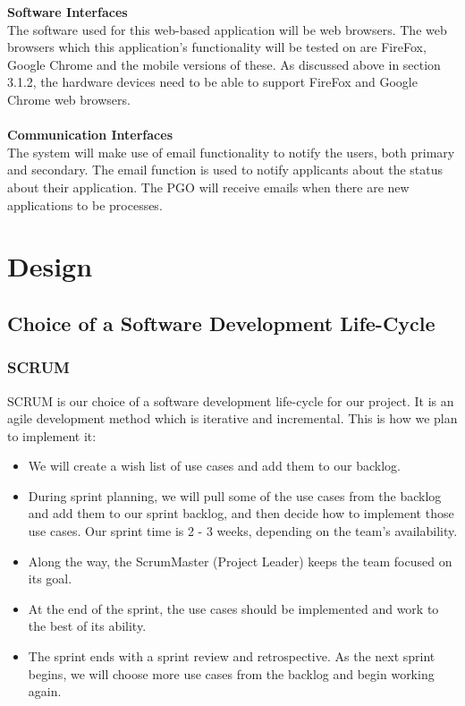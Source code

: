\documentclass{article}
\begin{document}
\textbf{Software Interfaces} \\
The software used for this web-based application will be web browsers. The web browsers which this application’s functionality will be tested on are FireFox, Google Chrome and the mobile versions of these. As discussed above in section 3.1.2, the hardware devices need to be able to support FireFox and Google Chrome web browsers.\\  \\
\textbf{Communication Interfaces} \\
The system will make use of email functionality to notify the users, both primary and secondary. The email function is used to notify applicants about the status about their application. The PGO will receive emails when there are new applications to be processes. 

\section{Design}
\subsection{Choice of a Software Development Life-Cycle}
\subsubsection{SCRUM}
SCRUM is our choice of a software development life-cycle for our project. It is an agile development method which is iterative and incremental.
This is how we plan to implement it:
\begin{itemize}
\item We will create a wish list of use cases and add them to our backlog.
\item During sprint planning, we will pull some of the use cases from the backlog and add them to our sprint backlog, and then decide how to implement those use cases.
Our sprint time is 2 - 3 weeks, depending on the team's availability. 
\item Along the way, the ScrumMaster (Project Leader) keeps the team focused on its goal.
\item At the end of the sprint, the use cases should be implemented and work to the best of its ability. 
\item The sprint ends with a sprint review and retrospective.
As the next sprint begins, we will choose more use cases from the backlog and begin working again. \cite{Scrum}
\end{itemize}
\end{document}
